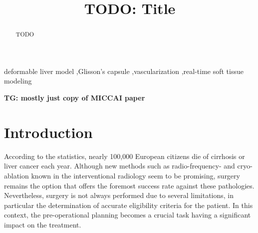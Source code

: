 \documentclass[final,3p,times,twocolumn]{elsarticle}
\newcommand{\TG}[1]{{\color{blue}\textbf{TG: #1}}}
\begin{document}
\begin{frontmatter}



\title{TODO: Title} %


\author{}

\address{}

\begin{abstract}
TODO %
\end{abstract}

\begin{keyword}
deformable liver model \sep Glisson's capsule \sep vascularization \sep real-time soft tissue modeling


\end{keyword}

\end{frontmatter}


\TG{mostly just copy of MICCAI paper}

\section{Introduction} %

According to the statistics, nearly 100,000 European citizens die of cirrhosis or liver cancer each year. 
Although new methods such as radio-frequency- and cryo-ablation known in the interventional radiology 
seem to be promising, surgery remains the option that offers the foremost success rate against these pathologies. 
Nevertheless, surgery is not always performed due to several limitations, in particular the determination 
of accurate eligibility criteria for the patient. 
In this context, the pre-operational planning becomes a crucial task having a significant impact on the treatment. 
\end{document}
